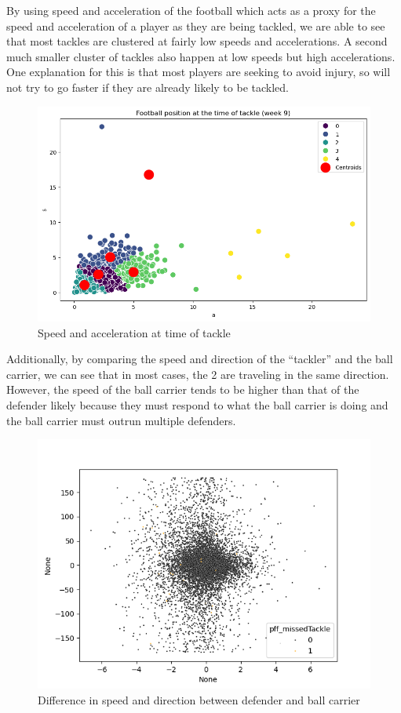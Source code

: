 \documentclass[bibtex, sigconf, hyperref={colorlinks=true,linkcolor=blue,urlcolor=blue}]{acmart}
\begin{document}
By using speed and acceleration of the football which acts as a proxy for the
speed and acceleration of a player as they are being tackled, we are able to see
that most tackles are clustered at fairly low speeds and accelerations. A second
much smaller cluster of tackles also happen at low speeds but high accelerations.
One explanation for this is that most players are seeking to avoid injury, so
will not try to go faster if they are already likely to be tackled.

\begin{figure}[h]
  \centering
  \includegraphics[width=\linewidth]{speed-accel}
  \caption{Speed and acceleration at time of tackle}
\end{figure}

Additionally, by comparing the speed and direction of the ``tackler'' and the
ball carrier, we can see that in most cases, the 2 are traveling in the same
direction. However, the speed of the ball carrier tends to be higher than that
of the defender likely because they must respond to what the ball carrier is
doing and the ball carrier must outrun multiple defenders.
\begin{figure}[h]
  \centering
  \includegraphics[width=\linewidth]{speed}
  \caption{Difference in speed and direction between defender and ball carrier}
\end{figure}
\end{document}
